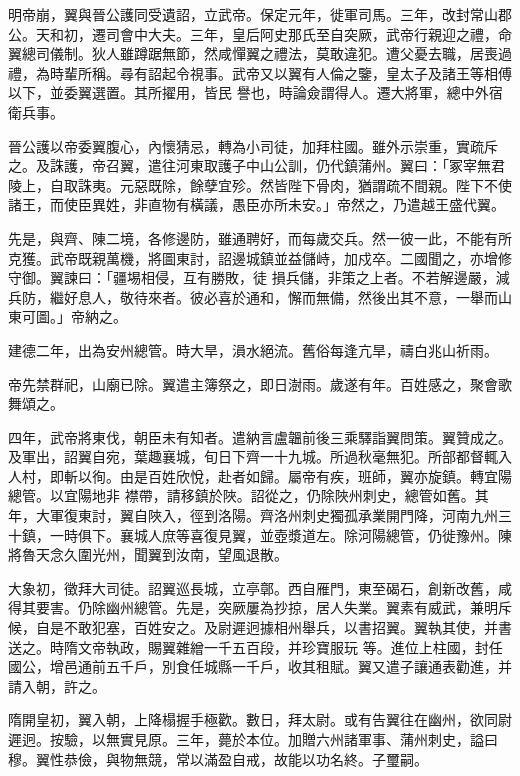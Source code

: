 \begin{pinyinscope}
 明帝崩，翼與晉公護同受遺詔，立武帝。保定元年，徙軍司馬。三年，改封常山郡公。天和初，遷司會中大夫。三年，皇后阿史那氏至自突厥，武帝行親迎之禮，命翼總司儀制。狄人雖蹲踞無節，然咸憚翼之禮法，莫敢違犯。遭父憂去職，居喪過禮，為時輩所稱。尋有詔起令視事。武帝又以翼有人倫之鑒，皇太子及諸王等相傅以下，並委翼選置。其所擢用，皆民
 譽也，時論僉謂得人。遷大將軍，總中外宿衛兵事。



 晉公護以帝委翼腹心，內懷猜忌，轉為小司徒，加拜柱國。雖外示崇重，實疏斥之。及誅護，帝召翼，遣往河東取護子中山公訓，仍代鎮蒲州。翼曰：「冢宰無君陵上，自取誅夷。元惡既除，餘孽宜殄。然皆陛下骨肉，猶謂疏不間親。陛下不使諸王，而使臣異姓，非直物有橫議，愚臣亦所未安。」帝然之，乃遣越王盛代翼。



 先是，與齊、陳二境，各修邊防，雖通聘好，而每歲交兵。然一彼一此，不能有所克獲。武帝既親萬機，將圖東討，詔邊城鎮並益儲峙，加戍卒。二國聞之，亦增修守御。翼諫曰：「疆埸相侵，互有勝敗，徒
 損兵儲，非策之上者。不若解邊嚴，減兵防，繼好息人，敬待來者。彼必喜於通和，懈而無備，然後出其不意，一舉而山東可圖。」帝納之。



 建德二年，出為安州總管。時大旱，溳水絕流。舊俗每逢亢旱，禱白兆山祈雨。



 帝先禁群祀，山廟已除。翼遣主簿祭之，即日澍雨。歲遂有年。百姓感之，聚會歌舞頌之。



 四年，武帝將東伐，朝臣未有知者。遣納言盧韞前後三乘驛詣翼問策。翼贊成之。及軍出，詔翼自宛，葉趣襄城，旬日下齊一十九城。所過秋毫無犯。所部都督輒入人村，即斬以徇。由是百姓欣悅，赴者如歸。屬帝有疾，班師，翼亦旋鎮。轉宜陽總管。以宜陽地非
 襟帶，請移鎮於陜。詔從之，仍除陜州刺史，總管如舊。其年，大軍復東討，翼自陜入，徑到洛陽。齊洛州刺史獨孤承業開門降，河南九州三十鎮，一時俱下。襄城人庶等喜復見翼，並壺漿道左。除河陽總管，仍徙豫州。陳將魯天念久圍光州，聞翼到汝南，望風退散。



 大象初，徵拜大司徒。詔翼巡長城，立亭鄣。西自雁門，東至碣石，創新改舊，咸得其要害。仍除幽州總管。先是，突厥屢為抄掠，居人失業。翼素有威武，兼明斥候，自是不敢犯塞，百姓安之。及尉遲迥據相州舉兵，以書招翼。翼執其使，并書送之。時隋文帝執政，賜翼雜繒一千五百段，并珍寶服玩
 等。進位上柱國，封任國公，增邑通前五千戶，別食任城縣一千戶，收其租賦。翼又遣子讓通表勸進，并請入朝，許之。



 隋開皇初，翼入朝，上降榻握手極歡。數日，拜太尉。或有告翼往在幽州，欲同尉遲迥。按驗，以無實見原。三年，薨於本位。加贈六州諸軍事、蒲州刺史，謚曰穆。翼性恭儉，與物無競，常以滿盈自戒，故能以功名終。子璽嗣。




\end{pinyinscope}
